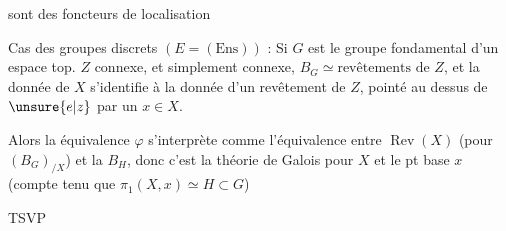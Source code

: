 sont des foncteurs de localisation

Cas des groupes discrets $(E=(\mathrm{Ens}))$ : Si $G$ est le groupe fondamental  d'un espace top. $Z$ connexe,  et  simplement connexe, $B_G\simeq\text{revêtements de }Z$,  et la donnée de $X$ s'identifie à la donnée d'un revêtement  de $Z$, pointé au dessus de $\unsure{e|z}$ par un $x\in X$.

Alors la  équivalence $\varphi$  s'interprète  comme l'équivalence entre $\operatorname{Rev}(X)$ (pour $(B_G)_{/X}$) et la  $B_H$, donc c'est la théorie de Galois pour $X$ et le pt base $x$ (compte tenu que $\pi_1(X,x)\simeq H\subset G$)

TSVP
